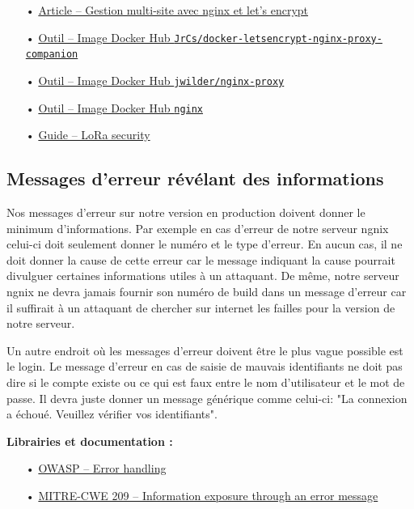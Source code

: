 \documentclass[12pt]{article}
\begin{document}
\begin{itemize}
\item[•] \href{https://meta.discourse.org/t/help-multisite-with-letsencrypt-nginx-proxy-companion/88192}{Article -- Gestion multi-site avec nginx et let's encrypt}
\item[•] \href{https://github.com/JrCs/docker-letsencrypt-nginx-proxy-companion}{Outil -- Image Docker Hub \texttt{JrCs/docker-letsencrypt-nginx-proxy-companion}}
\item[•] \href{https://github.com/jwilder/nginx-proxy}{Outil -- Image Docker Hub \texttt{jwilder/nginx-proxy}}
\item[•] \href{https://hub.docker.com/_/nginx/}{Outil -- Image Docker Hub \texttt{nginx}}
\item[•] \href{https://labs.mwrinfosecurity.com/assets/BlogFiles/mwri-LoRa-security-guide-1.2-2016-03-22.pdf}{Guide -- LoRa security}
\end{itemize}

\subsection{Messages d'erreur révélant des informations}
\label{ssec:cm-messageserreurs}

Nos messages d'erreur sur notre version en production doivent donner le minimum d'informations. Par exemple en cas d'erreur de notre serveur ngnix celui-ci doit seulement donner le numéro et le type d'erreur. En aucun cas, il ne doit donner la cause de cette erreur car le message indiquant la cause pourrait divulguer certaines informations utiles à un attaquant. De même, notre serveur ngnix ne devra jamais fournir son numéro de build dans un message d'erreur car il suffirait à un attaquant de chercher sur internet les failles pour la version de notre serveur. 

Un autre endroit où les messages d'erreur doivent être le plus vague possible est le login. Le message d'erreur en cas de saisie de mauvais identifiants ne doit pas dire si le compte existe ou ce qui est faux entre le nom d'utilisateur et le mot de passe. Il devra juste donner un message générique comme celui-ci: "La connexion a échoué. Veuillez vérifier vos identifiants".

\medskip
\textbf{Librairies et documentation :}

\begin{itemize}
\item[•] \href{https://www.owasp.org/index.php/Error_Handling}{OWASP -- Error handling}
\item[•] \href{https://cwe.mitre.org/data/definitions/209.html}{MITRE-CWE 209 -- Information exposure through an error message}
\end{itemize}
\end{document}
